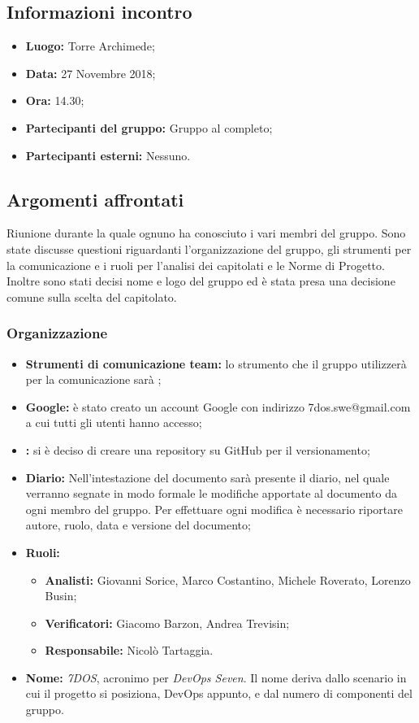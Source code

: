 \subsection{Informazioni incontro}
\begin{itemize}
	\item { \textbf{Luogo:} Torre Archimede};
	\item { \textbf{Data:} 27 Novembre 2018};
	\item { \textbf{Ora:} 14.30};
	\item { \textbf{Partecipanti del gruppo:} Gruppo al completo};
	\item { \textbf{Partecipanti esterni:} Nessuno}.
\end{itemize}


\subsection{Argomenti affrontati}
Riunione durante la quale ognuno ha conosciuto i vari membri del gruppo. Sono state discusse questioni riguardanti l'organizzazione del gruppo, gli strumenti per la comunicazione e i ruoli per l'analisi dei capitolati e le Norme di Progetto. Inoltre sono stati decisi nome e logo del gruppo ed è stata presa una decisione comune sulla scelta del capitolato.

\subsubsection{Organizzazione}
\begin{itemize}
	\item { \textbf{Strumenti di comunicazione team:} lo strumento che il gruppo utilizzerà per la comunicazione sarà \textit{};}
	\item{ \textbf{Google:} è stato creato un account Google con indirizzo 7dos.swe@gmail.com a cui tutti gli utenti hanno accesso;}
	\item { \textbf{:} si è deciso di creare una repository su GitHub per il versionamento;}
	\item { \textbf{Diario:} Nell'intestazione del documento sarà presente il diario, nel quale verranno segnate in modo formale le modifiche apportate al documento da ogni membro del gruppo.
		Per effettuare ogni modifica è necessario riportare autore, ruolo, data e versione del documento;}
	\item { \textbf{Ruoli:}  }
	\begin{itemize}
		\item { \textbf{Analisti:} Giovanni Sorice, Marco Costantino, Michele Roverato, Lorenzo Busin;}
		\item { \textbf{Verificatori:} Giacomo Barzon, Andrea Trevisin;}
		\item { \textbf{Responsabile:} Nicolò Tartaggia.}
	\end{itemize}
	\item { \textbf{Nome:} \emph{7DOS}, acronimo per \emph{DevOps Seven}. Il nome deriva dallo scenario in cui il progetto si posiziona, DevOps appunto, e dal numero di componenti del gruppo.}
\end{itemize}

